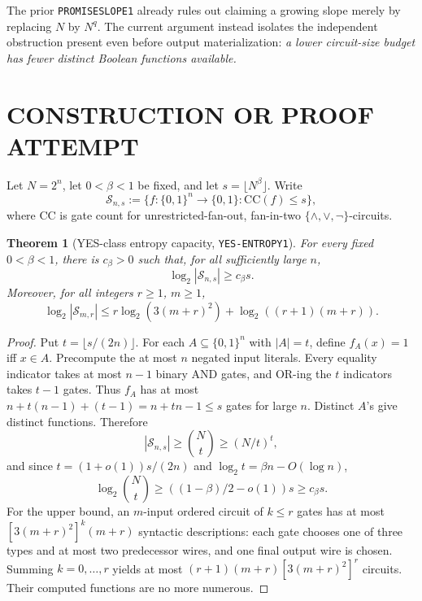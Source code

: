\documentclass[11pt]{article}
\newtheorem{theorem}{Theorem}
\begin{document}
The prior \texttt{PROMISESLOPE1} already rules out
claiming a growing slope merely by replacing \(N\) by \(N^q\).
The current argument instead isolates the independent obstruction
present even before output materialization: \emph{a lower circuit-size
budget has fewer distinct Boolean functions available.}

\section{CONSTRUCTION OR PROOF ATTEMPT}
Let \(N=2^n\), let \(0<\beta<1\) be fixed,
and let \(s=\lfloor N^\beta\rfloor\).
Write
\[
  \mathcal S_{n,s}:=
  \{f:\{0,1\}^n\to\{0,1\}\colon
       \mathrm{CC}(f)\le s\},
\]
where \(\mathrm{CC}\) is gate count for unrestricted-fan-out,
fan-in-two \(\{\wedge,\vee,\neg\}\)-circuits.

\begin{theorem}[YES-class entropy capacity, \texttt{YES-ENTROPY1}]
For every fixed \(0<\beta<1\), there is \(c_\beta>0\)
such that, for all sufficiently large \(n\),
\[
  \boxed{\log_2|\mathcal S_{n,s}|\ge c_\beta s.}
\]
Moreover, for all integers \(r\ge1\), \(m\ge1\),
\[
  \boxed{
   \log_2|\mathcal S_{m,r}|
   \le r\log_2(3(m+r)^2)
      +\log_2((r+1)(m+r)).
  }
\]
\end{theorem}
\begin{proof}
Put \(t=\lfloor s/(2n)\rfloor\).
For each \(A\subseteq\{0,1\}^n\) with \(|A|=t\),
define \(f_A(x)=1\) iff \(x\in A\).
Precompute the at most \(n\) negated input literals.
Every equality indicator takes at most \(n-1\)
binary AND gates, and OR-ing the \(t\) indicators
takes \(t-1\) gates.  Thus \(f_A\) has at most
\(n+t(n-1)+(t-1)=n+tn-1\le s\) gates
for large \(n\). Distinct \(A\)'s give distinct functions.
Therefore
\[
  |\mathcal S_{n,s}|
     \ge {N\choose t}
     \ge (N/t)^t,
\]
and since \(t=(1+o(1))s/(2n)\) and
\(\log_2t=\beta n-O(\log n)\),
\[
 \log_2 {N\choose t}
 \ge ((1-\beta)/2-o(1))s
 \ge c_\beta s.
\]
For the upper bound, an \(m\)-input ordered
circuit of \(k\le r\) gates has at most
\([3(m+r)^2]^k(m+r)\) syntactic descriptions:
each gate chooses one of three types and at most two
predecessor wires, and one final output wire is chosen.
Summing \(k=0,\ldots,r\) yields at most
\((r+1)(m+r)[3(m+r)^2]^r\) circuits.
Their computed functions are no more numerous.
\end{proof}
\end{document}
